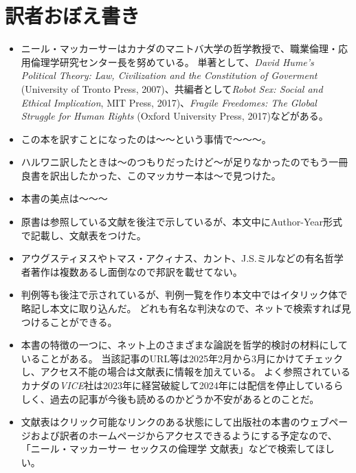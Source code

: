 \documentclass[paper=a4,book,openany]{jlreq}
\begin{document}
\chapter*{訳者おぼえ書き}
{}
\begin{itemize}
\item ニール・マッカーサーはカナダのマニトバ大学の哲学教授で、職業倫理・応用倫理学研究センター長を努めている。
単著として、\emph{David Hume's Political Theory: Law, Civilization and the Constitution of Goverment} (University of Tronto Press, 2007)、共編者として\emph{Robot Sex: Social and Ethical Implication}, MIT Press, 2017)、\emph{Fragile Freedomes: The Global Struggle for Human Rights} (Oxford University Press, 2017)などがある。

\item この本を訳すことになったのは〜〜という事情で〜〜〜。

\item ハルワニ訳したときは〜のつもりだったけど〜が足りなかったのでもう一冊良書を訳出したかった、このマッカサー本は〜で見つけた。
\item 本書の美点は〜〜〜
\item 原書は参照している文献を後注で示しているが、本文中にAuthor-Year形式で記載し、文献表をつけた。
\item アウグスティヌスやトマス・アクィナス、カント、J.S.ミルなどの有名哲学者著作は複数あるし面倒なので邦訳を載せてない。
\item 判例等も後注で示されているが、判例一覧を作り本文中ではイタリック体で略記し本文に取り込んだ。
どれも有名な判決なので、ネットで検索すれば見つけることができる。
\item 本書の特徴の一つに、ネット上のさまざまな論説を哲学的検討の材料にしていることがある。
当該記事のURL等は2025年2月から3月にかけてチェックし、アクセス不能の場合は文献表に情報を加えている。
よく参照されているカナダの\emph{VICE}社は2023年に経営破綻して2024年には配信を停止しているらしく、過去の記事が今後も読めるのかどうか不安があるとのことだ。

\item 文献表はクリック可能なリンクのある状態にして出版社の本書のウェブページおよび訳者のホームページからアクセスできるようにする予定なので、「ニール・マッカーサー セックスの倫理学 文献表」などで検索してほしい。


\end{itemize}
\end{document}
